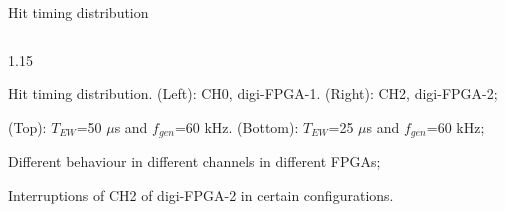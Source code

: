 \documentclass{beamer}
\begin{document}
\begin{frame}{Hit timing distribution}
\begin{columns}
            \begin{column}{1.15\framewidth}
                \setlength{\leftmargini}{1.3em}

            \vspace{-0.5mm}
        
             \begin{itemize}
           {\footnotesize 
            \item Hit timing distribution. (Left): CH0, digi-FPGA-1. (Right): CH2, digi-FPGA-2;
             \item (Top): $T_{EW}$=50 $\mu$s and $f_{gen}$=60 kHz. (Bottom): $T_{EW}$=25 $\mu$s and $f_{gen}$=60 kHz;
             \item Different behaviour in different channels in different FPGAs;
             \vspace{-1mm}
                \item Interruptions of CH2 of digi-FPGA-2 in certain configurations.   }    
                 \end{itemize}
                 \end{column}
        \end{columns}   
    \end{frame}

    
\end{document}
